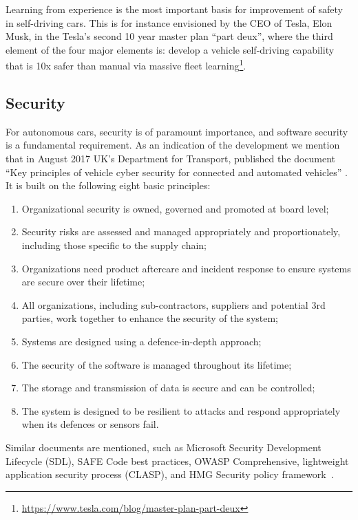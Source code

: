 Learning from experience is the most important basis for improvement of safety in self-driving cars. This is for instance envisioned by the CEO of Tesla, Elon Musk, in the Tesla's second 10 year master plan \enquote{part deux}, where the third element of the four major elements is: develop a vehicle self-driving capability that is 10x safer than manual via massive fleet learning\footnote{\url{https://www.tesla.com/blog/master-plan-part-deux}}.

\subsection{Security}
\label{sec:EAofTC:Security}

For autonomous cars, security is of paramount importance, and software security is a fundamental requirement. As an indication of the development we mention that in August 2017 UK's Department for Transport, published the document \enquote{Key principles of vehicle cyber security for connected and automated vehicles} \cite{DepartmentforTransportDfT2017}. It is built on the following eight basic principles:

\begin{enumerate}
\item Organizational security is owned, governed and promoted at board level;
\item Security risks are assessed and managed appropriately and proportionately, including those specific to the supply chain;
\item Organizations need product aftercare and incident response to ensure systems are secure over their lifetime;
\item All organizations, including sub-contractors, suppliers and potential 3rd parties, work together to enhance the security of the system;
\item Systems are designed using a defence-in-depth approach;
\item The security of the software is managed throughout its lifetime;
\item The storage and transmission of data is secure and can be controlled;
\item The system is designed to be resilient to attacks and respond appropriately when its defences or sensors fail.
\end{enumerate}

Similar documents are mentioned, such as Microsoft Security Development Lifecycle (SDL), SAFE Code best practices, OWASP Comprehensive, lightweight application security process (CLASP), and HMG Security policy framework~\cite{DepartmentforTransportDfT2017}.

